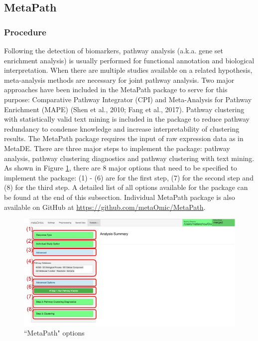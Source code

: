 \subsection{MetaPath}
\subsubsection{Procedure}

Following the detection of biomarkers, pathway analysis (a.k.a. gene set enrichment analysis) is usually performed for functional annotation and biological interpretation. When there are multiple studies available on a related hypothesis, meta-analysis methods are necessary for joint pathway analysis. Two major approaches have been included in the MetaPath package to serve for this purpose: Comparative Pathway Integrator (CPI) and Meta-Analysis for Pathway Enrichment (MAPE) (Shen et al., 2010; Fang et al., 2017). Pathway clustering with statistically valid text mining is included in the package to reduce pathway redundancy to condense knowledge and increase interpretability of clustering results. The MetaPath package requires the input of raw expression data as in MetaDE. There are three major steps to implement the package: pathway analysis, pathway clustering diagnostics and pathway clustering with text mining. As shown in Figure \ref{fig:MetaPathoption}, there are 8 major options that need to be specified to implement the package: (1) - (6) are for the first step, (7) for the second step and (8) for the third step. A detailed list of all options available for the package can be found at the end of this subsection. Individual MetaPath package is also available on GitHub at \url{https://github.com/metaOmic/MetaPath}.

\begin{figure}[H]
\begin{center}
\includegraphics[scale=0.45]{./figure/metaPath/metaPathoption.jpg}
\caption{``MetaPath" options}
\label{fig:MetaPathoption}
\end{center}
\end{figure}

